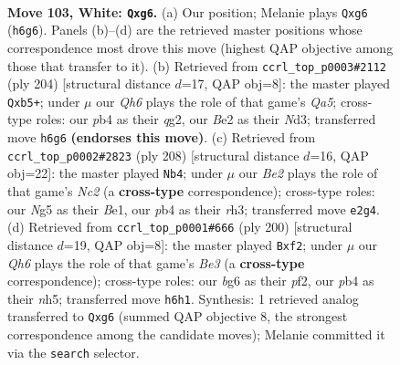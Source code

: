 \documentclass[11pt]{article}
\begin{document}
\clearpage

\begin{figure}[p]\centering
\begin{subfigure}{0.46\textwidth}\centering
\resizebox{\linewidth}{!}{%
\newchessgame
\chessboard[
  setfen={8/8/6bQ/4k1N1/1p6/4K3/4B3/8 w - - 1 103},
  showmover=false,
  pgfstyle=straightmove, color=movearrow, markmove={h6-g6}
]}
\caption{}
\end{subfigure}\hfill
\begin{subfigure}{0.46\textwidth}\centering
\resizebox{\linewidth}{!}{%
\newchessgame
\chessboard[
  setfen={8/8/8/Qp6/8/3NK3/6q1/1k6 w - - 19 103},
  showmover=false,
  pgfstyle=straightmove, color=movearrow, markmove={a5-b5}
]}
\caption{}
\end{subfigure}
\\[4pt]
\begin{subfigure}{0.46\textwidth}\centering
\resizebox{\linewidth}{!}{%
\newchessgame
\chessboard[
  setfen={8/8/6R1/6b1/8/3K1k1r/2N5/4B3 w - - 76 105},
  showmover=false,
  pgfstyle=straightmove, color=movearrow, markmove={c2-b4}
]}
\caption{}
\end{subfigure}\hfill
\begin{subfigure}{0.46\textwidth}\centering
\resizebox{\linewidth}{!}{%
\newchessgame
\chessboard[
  setfen={8/2k5/8/3BK2n/8/4B3/5p2/8 w - - 0 101},
  showmover=false,
  pgfstyle=straightmove, color=movearrow, markmove={e3-f2}
]}
\caption{}
\end{subfigure}
\caption{\textbf{Move 103, White: \texttt{Qxg6}.} (a) Our position; Melanie plays \texttt{Qxg6} (\texttt{h6g6}). Panels (b)--(d) are the retrieved master positions whose correspondence most drove this move (highest QAP objective among those that transfer to it). (b) Retrieved from \texttt{ccrl\_top\_p0003\#2112} (ply 204) [structural distance $d$=17, QAP obj=8]: the master played \texttt{Qxb5+}; under $\mu$ our \emph{Qh6} plays the role of that game's \emph{Qa5}; cross-type roles: our \emph{p}b4 as their \emph{q}g2, our \emph{B}e2 as their \emph{N}d3; transferred move \texttt{h6g6} \textbf{(endorses this move)}. (c) Retrieved from \texttt{ccrl\_top\_p0002\#2823} (ply 208) [structural distance $d$=16, QAP obj=22]: the master played \texttt{Nb4}; under $\mu$ our \emph{Be2} plays the role of that game's \emph{Nc2} (a \textbf{cross-type} correspondence); cross-type roles: our \emph{N}g5 as their \emph{B}e1, our \emph{p}b4 as their \emph{r}h3; transferred move \texttt{e2g4}. (d) Retrieved from \texttt{ccrl\_top\_p0001\#666} (ply 200) [structural distance $d$=19, QAP obj=8]: the master played \texttt{Bxf2}; under $\mu$ our \emph{Qh6} plays the role of that game's \emph{Be3} (a \textbf{cross-type} correspondence); cross-type roles: our \emph{b}g6 as their \emph{p}f2, our \emph{p}b4 as their \emph{n}h5; transferred move \texttt{h6h1}. Synthesis: 1 retrieved analog transferred to \texttt{Qxg6} (summed QAP objective 8, the strongest correspondence among the candidate moves); Melanie committed it via the \texttt{search} selector.}
\label{fig:thought-m204}
\end{figure}
\end{document}
